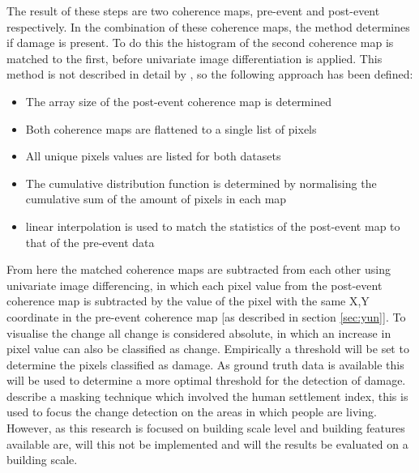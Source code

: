 \noindent The result of these steps are two coherence maps, pre-event and post-event respectively. In the combination of these coherence maps, the method determines if damage is present. To do this the histogram of the second coherence map is matched to the first, before univariate image differentiation is applied. This method is not described in detail by \citet{Yun2015}, so the following approach has been defined:

\begin{itemize}
	\item The array size of the post-event coherence map is determined
	\item Both coherence maps are flattened to a single list of pixels
	\item All unique pixels values are listed for both datasets 
	\item The cumulative distribution function is determined by normalising the cumulative sum of the amount of pixels in each map
	\item linear interpolation is used to match the statistics of the post-event map to that of the pre-event data\\
\end{itemize}

\noindent From here the matched coherence maps are subtracted from each other using univariate image differencing, in which each pixel value from the post-event coherence map is subtracted by the value of the pixel with the same X,Y coordinate in the pre-event coherence map [as described in section \ref{sec:yun}]. To visualise the change all change is considered absolute, in which an increase in pixel value can also be classified as change. Empirically a threshold will be set to determine the pixels classified as damage. As ground truth data is available this will be used to determine a more optimal threshold for the detection of damage. \citet{Yun2015} describe a masking technique which involved the human settlement index, this is used to focus the change detection on the areas in which people are living. However, as this research is focused on building scale level and building features available are, will this not be implemented and will the results be evaluated on a building scale.

